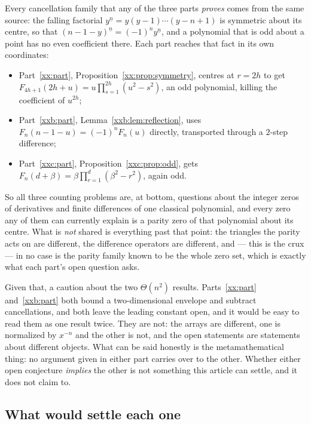 \documentclass[11pt,a4paper]{article}
\numberwithin{equation}{section}
\theoremstyle{definition}
\theoremstyle{remark}
\theoremstyle{plain}
\newcommand{\fall}[2]{#1^{\underline{#2}}}
\begin{document}
Every cancellation family that any of the three parts \emph{proves} comes from
the same source: the falling factorial $\fall{y}{n}=y(y-1)\cdots(y-n+1)$ is
symmetric about its centre, so that $\fall{(n-1-y)}{n}=(-1)^n\fall{y}{n}$, and a
polynomial that is odd about a point has no even coefficient there.  Each part
reaches that fact in its own coordinates:
\begin{itemize}[leftmargin=1.6em,itemsep=2pt]
\item Part~\ref{xx:part}, Proposition~\ref{xx:prop:symmetry}, centres at $r=2h$
 to get $F_{4h+1}(2h+u)=u\prod_{s=1}^{2h}(u^2-s^2)$, an odd polynomial, killing
 the coefficient of $u^{2h}$;
\item Part~\ref{xxb:part}, Lemma~\ref{xxb:lem:reflection}, uses
 $F_n(n-1-u)=(-1)^nF_n(u)$ directly, transported through a $2$-step difference;
\item Part~\ref{xxc:part}, Proposition~\ref{xxc:prop:odd}, gets
 $F_n(d+\beta)=\beta\prod_{r=1}^d(\beta^2-r^2)$, again odd.
\end{itemize}
So all three counting problems are, at bottom, questions about the integer zeros
of derivatives and finite differences of one classical polynomial, and every
zero any of them can currently explain is a parity zero of that polynomial about
its centre.  What is \emph{not} shared is everything past that point: the
triangles the parity acts on are different, the difference operators are
different, and --- this is the crux --- in no case is the parity family known to
be the whole zero set, which is exactly what each part's open question asks.

Given that, a caution about the two $\Theta(n^2)$ results.  Parts~\ref{xx:part}
and~\ref{xxb:part} both bound a two-dimensional envelope and subtract
cancellations, and both leave the leading constant open, and it would be easy to
read them as one result twice.  They are not: the arrays are different, one is
normalized by $x^{-n}$ and the other is not, and the open statements are
statements about different objects.  What can be said honestly is the
metamathematical thing: no argument given in either part carries over to the
other.  Whether either open conjecture \emph{implies} the other is not something
this article can settle, and it does not claim to.

\subsection{What would settle each one}\label{syn:open}
\end{document}
